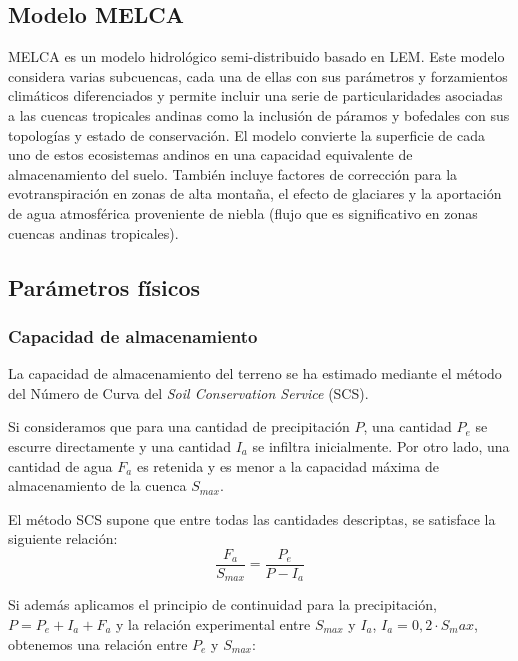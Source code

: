 \subsection{Modelo MELCA}

MELCA es un modelo hidrológico semi-distribuido basado en LEM. 
Este modelo considera varias subcuencas, cada una de ellas con sus parámetros y forzamientos climáticos diferenciados
y permite incluir una serie de particularidades asociadas a las cuencas tropicales andinas como la inclusión de páramos 
y bofedales con sus topologías y estado de conservación. El modelo convierte la superficie de cada uno de estos 
ecosistemas andinos en una capacidad equivalente de almacenamiento del suelo. 
También  incluye factores de corrección para  la evotranspiración en zonas de alta montaña, el efecto de glaciares 
y la aportación de agua atmosférica proveniente de niebla (flujo que es significativo en zonas cuencas andinas tropicales). 

\subsection{Parámetros físicos}

\subsubsection{Capacidad de almacenamiento}
La capacidad de almacenamiento del terreno se ha estimado mediante el método del Número de 
Curva del \textit{Soil Conservation Service} (SCS).

Si consideramos que para una cantidad de precipitación $P$, una cantidad $P_e$ se escurre directamente y una cantidad
$I_a$ se infiltra inicialmente. Por otro lado, una cantidad de agua $F_a$ es retenida y es  
menor a la capacidad máxima de almacenamiento de la cuenca $S_{max}$.

El método SCS supone que entre todas las cantidades descriptas, se satisface la siguiente relación:
\begin{equation}
    \frac{F_a}{S_{max}}=\frac{P_e}{P-I_a}
\end{equation}

Si además aplicamos el principio de continuidad para la precipitación, $P = P_e+I_a+F_a$ y la relación experimental
entre $S_{max}$ y $I_a$, $I_a=0,2\cdot S_max$, obtenemos una relación entre $P_e$ y $S_{max}$:

